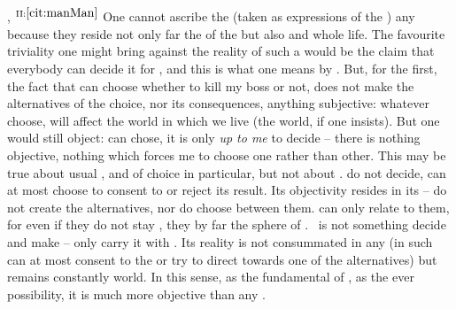 , $^{{\rm
    II}:\ref{cit:manMan}}$ One cannot ascribe the  (taken as
expressions of the  \Yes) any  because they reside not
only far  the  of the  but also
 and  whole life. The favourite triviality one might bring
against the reality of such a  would be the claim that everybody can
decide it for , and this is what one means by . But,
for the first, the fact that  can choose whether to kill my boss or not,
does not make the alternatives of the choice, nor its consequences, anything
subjective: whatever  choose, will affect the world in which we live (the
 world, if one insists).  But one would still object:  can
chose, it is only {\em up to me} to decide -- there is nothing {objective},
nothing  which forces me to choose one rather than other. This may
be true about usual , and  of choice in particular, but not
about \sch.  do not decide,  can at most choose to consent to or
reject its result. Its {objectivity} resides in its  -- 
do not create the alternatives, nor do  choose between them.
 can only relate to them, for even if they do not stay 
, they by far  the sphere of .
 \Sch\ is not something  decide and make --  only carry it
with . Its reality is not consummated in any  (in such
  can at most  consent to the  or try
to direct  towards one of the alternatives) but remains constantly
  world. In this sense, as the fundamental  of
, as the ever  possibility, it is much more
{objective} than any .
%

